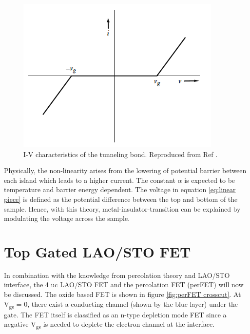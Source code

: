 \documentclass[11pt,a4paper]{report}
\begin{document}
\begin{figure}
    \centering
    \includegraphics[scale = 0.9]{Figures/Piecewise-function.png}
    \caption{I-V characteristics of the tunneling bond. Reproduced from Ref \cite{Stauffer_RRTN_2009}.}
    \label{fig:piecewise-function}
\end{figure}

Physically, the non-linearity arises from the lowering of potential barrier between each island which leads to a higher current. The constant $\alpha$ is expected to be temperature and barrier energy dependent. The voltage in equation \ref{eq:linear piece} is defined as the potential difference between the top and bottom of the sample. Hence, with this theory, metal-insulator-transition can be explained by modulating the voltage across the sample.

\newpage
\section{Top Gated LAO/STO FET}
In combination with the knowledge from percolation theory and LAO/STO interface, the 4 uc LAO/STO FET and the percolation FET (perFET) will now be discussed. The oxide based FET is shown in figure \ref{fig:perFET crosscut}. At V\textsubscript{gs} = 0, there exist a conducting channel (shown by the blue layer) under the gate. The FET itself is classified as an n-type depletion mode FET since a negative V\textsubscript{gs} is needed to deplete the electron channel at the interface.
\end{document}
